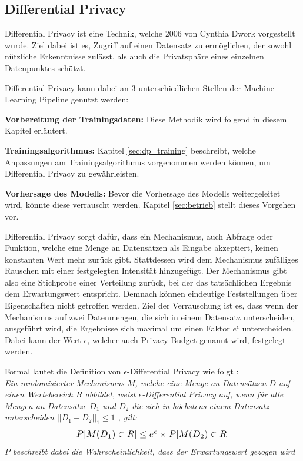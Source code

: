 \subsection{Differential Privacy}\label{sec:dp}

Differential Privacy ist eine Technik, welche 2006 von Cynthia Dwork \cite{P-26} vorgestellt wurde.
Ziel dabei ist es, Zugriff auf einen Datensatz zu ermöglichen, der sowohl nützliche Erkenntnisse zulässt, als auch die Privatsphäre eines einzelnen Datenpunktes schützt.

Differential Privacy kann dabei an 3 unterschiedlichen Stellen der Machine Learning Pipeline genutzt werden:
\begin{compactitem}
\item \textbf{Vorbereitung der Trainingsdaten:} Diese Methodik wird folgend in diesem Kapitel erläutert.
\item \textbf{Trainingsalgorithmus:} Kapitel \ref{sec:dp_training} beschreibt, welche Anpassungen am Trainingsalgorithmus vorgenommen werden können, um Differential Privacy zu gewährleisten.
\item \textbf{Vorhersage des Modells:} Bevor die Vorhersage des Modells weitergeleitet wird, könnte diese verrauscht werden. Kapitel \ref{sec:betrieb} stellt dieses Vorgehen vor.
\end{compactitem}


Differential Privacy \cite{P-26} sorgt dafür, dass ein Mechanismus, auch Abfrage oder Funktion, welche eine Menge an Datensätzen als Eingabe akzeptiert, keinen konstanten Wert mehr zurück gibt.
Stattdessen wird dem Mechanismus zufälliges Rauschen mit einer festgelegten Intensität hinzugefügt.
Der Mechanismus gibt also eine Stichprobe einer Verteilung zurück, bei der das tatsächlichen Ergebnis dem Erwartungswert entspricht.
Demnach können eindeutige Feststellungen über Eigenschaften nicht getroffen werden.
Ziel der Verrauschung ist es, dass wenn der Mechanismus auf zwei Datenmengen, die sich in einem Datensatz unterscheiden, ausgeführt wird, die Ergebnisse sich maximal um einen Faktor $e^\epsilon$ unterscheiden.
Dabei kann der Wert $\epsilon$, welcher auch Privacy Budget genannt wird, festgelegt werden.

Formal lautet die Definition von $\epsilon$-Differential Privacy wie folgt \cite{P-26}:\\
\textit{
Ein randomisierter Mechanismus $M$, welche eine Menge an Datensätzen $D$ auf einen Wertebereich $R$ abbildet, weist $\epsilon$-Differential Privacy auf, wenn für alle Mengen an Datensätze $D_{1}$ und $D_{2}$ die sich in höchstens einem Datensatz unterscheiden $||D_{1} - D_{2}||_{1} \leq 1$ , gilt:}
\begin{equation}
\resizebox{!}{0.3cm}{$
    P[M(D_{1}) \in R] \leq e^{\epsilon} \times P[M(D_{2}) \in R]
$}
\end{equation}
\textit{$P$ beschreibt dabei die Wahrscheinlichkeit, dass der Erwartungswert gezogen wird}

